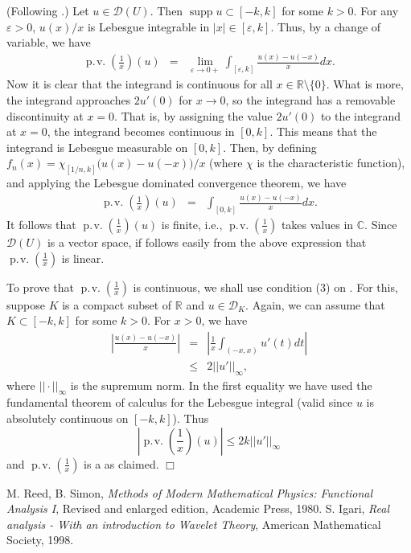 \documentclass[12pt]{article}
\newcommand{\sR}[0]{\mathbb{R}}
\newcommand{\sC}[0]{\mathbb{C}}
\begin{document}
\newcommand{\cpv}[0]{\operatorname{p.\!v.}(\frac{1}{x})}
\newcommand{\cD}[0]{\mathcal{D}}
\newcommand{\supp}[0]{\operatorname{supp}}
(Following \cite{reed, igari}.)
Let $u\in \cD(U)$. Then $\supp u \subset [-k,k]$ for
some $k>0$. For any $\varepsilon>0$,  $u(x)/x$ is Lebesgue integrable 
in $|x|\in[\varepsilon,k]$. Thus, by a change of variable, we have
\begin{eqnarray*}
\cpv(u) &=& \lim_{\varepsilon\to0+} \int_{[\varepsilon,k]} \frac{u(x)-u(-x)}{x} dx.
\end{eqnarray*}
Now it is clear that the integrand is continuous for all $x\in \sR\setminus\{0\}$.
What is more, the integrand approaches $2u'(0)$ for $x\to 0$, so the
integrand has a removable discontinuity at $x=0$. That is, by assigning the value 
$2u'(0)$ to the integrand at $x=0$, the integrand becomes continuous in $[0,k]$.
This means that the integrand is Lebesgue measurable on $[0,k]$. 
Then, by defining
$f_n(x) = \chi_{[1/n,k]} \big(u(x)-u(-x)\big)/x$
(where $\chi$ is the characteristic function), and
applying the Lebesgue dominated convergence theorem, we have
\begin{eqnarray*}
\cpv(u) &=& \int_{[0,k]} \frac{u(x)-u(-x)}{x} dx.
\end{eqnarray*}
It follows that $\cpv(u)$ is finite, i.e., $\cpv$ takes values in $\sC$. 
Since $\cD(U)$ is a vector space, if follows easily from the above expression 
that $\cpv$ is linear. 

To prove that $\cpv$ is continuous, we shall use condition (3) on 
.      
For this, suppose $K$ is a compact subset of $\sR$ and 
$u\in \cD_K$. Again, we can assume that $K\subset [-k,k]$ for some $k>0$.
For $x>0$, we have 
\begin{eqnarray*}
|\frac{u(x)-u(-x)}{x}| &=& |\frac{1}{x}\int_{(-x,x)} u'(t) dt| \\
&\le &  2 ||u'||_\infty,
\end{eqnarray*}
where $||\cdot||_\infty$ is the supremum norm. In the first equality we have used the
fundamental theorem of calculus for the Lebesgue integral (valid since 
$u$ is absolutely continuous on $[-k,k]$). Thus
$$ |\cpv(u)| \le 2k ||u'||_\infty$$
and $\cpv$ is a  as claimed. $\Box$

\begin{thebibliography}{9}
 M. Reed, B. Simon,
  \emph{Methods of Modern Mathematical Physics: Functional Analysis I},
Revised and enlarged edition,  Academic Press, 1980. 
 S. Igari, \emph{Real analysis - With an introduction to Wavelet Theory}, American Mathematical Society, 1998.
 \end{thebibliography}
\end{document}
